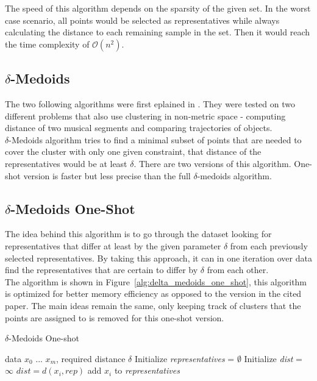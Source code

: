 \documentclass[thesis=B,english]{FITthesis}[2012/10/20]
\begin{document}
The speed of this algorithm depends on the sparsity of the given set.
In the worst case scenario, all points would be selected as representatives while always calculating the distance to each remaining sample in the set. Then it would reach the time complexity of $\mathcal{O}(n^2)$.

\subsection{$\delta$-Medoids}\label{subsec:delta_medoids}
The two following algorithms were first eplained in \cite{liebman2015representative}.
They were tested on two different problems that also use clustering in non-metric space - computing distance of two musical segments and comparing trajectories of objects.\\

$\delta$-Medoids algorithm tries to find a minimal subset of points that are needed to cover the cluster with only one given constraint, that distance of the representatives would be at least $\delta$.
There are two versions of this algorithm.
One-shot version is faster but less precise than the full $\delta$-medoids algorithm.

\subsection{$\delta$-Medoids One-Shot}

The idea behind this algorithm is to go through the dataset looking for representatives that differ at least by the given parameter $\delta$ from each previously selected representatives.
By taking this approach, it can in one iteration over data find the representatives that are certain to differ by $\delta$ from each other. \\

The algorithm is shown in Figure~\ref{alg:delta_medoids_one_shot}, this algorithm is optimized for better memory efficiency as opposed to the version in the cited paper.
The main ideas remain the same, only keeping track of clusters that the points are assigned to is removed for this one-shot version.

\begin{algorithm}\label{alg:delta_medoids_one_shot}
    \caption{$\delta$-Medoids One-shot}
    \label{delta_medoids_one_shot}
    \begin{algorithmic}[1]
        \INPUT data $x_0$ ... $x_m$, required distance $\delta$
        \STATE Initialize \textit{representatives} = $\emptyset$
            \STATE Initialize \textit{dist} = $\infty$
                    \STATE $dist = d(x_i, rep)$
                \ENDIF
            \ENDFOR
                \STATE add $x_i$ to \textit{representatives}
            \ENDIF
        \ENDFOR
    \end{algorithmic}
\end{algorithm}
\end{document}
